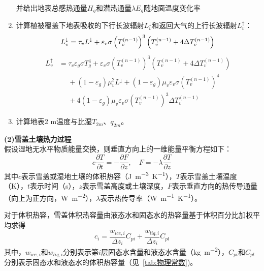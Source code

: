 \begin{enumerate}
    并给出地表总感热通量$H_g$和潜热通量$\lambda E_g$随地面温度变化率
    \item 计算植被覆盖下地表吸收的下行长波辐射$L_{v}^\downarrow$和返回大气的上行长波辐射$L_v ^\uparrow$：
    \begin{equation}
        L_{v} ^\downarrow =  \tau_{v} L ^\downarrow+\varepsilon_{v}\sigma \left (T_{v}^{(n - 1)}\right)^3\left( T_{v}^{(n - 1)} + 4\Delta T_{v}^{(n - 1)} \right)\\
    \end{equation}
    \begin{equation}
    \begin{aligned}
        L_{v}^ \uparrow &=  \tau_{v} \varepsilon_{g} \sigma T_{g}^{4}+ \varepsilon_{v}\sigma \left ( T_{v}^{(n - 1)}\right )^3\left( T_{v}^{(n - 1)} + 4\Delta T_{v}^{(n - 1)} \right) \\[1ex]
&\mathrel{\phantom{=}} + \left ( 1- \varepsilon_{g} \right)\mu_{v}^2 L ^\downarrow + \left ( 1- \varepsilon_{g} \right) \mu_{v} \varepsilon_{v} \sigma \left (T_{v}^{(n - 1)}\right) ^4 \\[1ex]
&\mathrel{\phantom{=}} + 4 \left ( 1- \varepsilon_{g} \right) \mu_{v} \varepsilon_{v} \sigma \left (T_{v}^{(n - 1)}\right)^3 \Delta T_{v}^{(n - 1)}
    \end{aligned}
    \end{equation}
    \item 计算地表2 m温度与比湿$T_{2m}$、$q_{2m}$。
\end{enumerate}

\textbf {(2)雪盖土壤热力过程}\\

假设湿地无水平物质能量交换，则垂直方向上的一维能量平衡方程如下：
\begin{equation}\label{eq:WetlandThermalCons1}
    c \frac{\partial T}{\partial t}=-\frac{\partial F}{\partial z},  \quad F=-\lambda \frac{\partial T}{\partial z}
\end{equation}
其中$c$表示雪盖或湿地土壤的体积热容（\unit{J.m^{-3}.K^{-1}}），$T$表示雪盖土壤温度（K），$t$表示时间（s），$z$表示雪盖高度或土壤深度，$F$表示垂直方向的热传导通量（向上为正方向，\unit{W.m^{-2}}），$\lambda$表示热传导率（\unit{W.m^{-1}.K^{-1}}）。

对于体积热容，雪盖体积热容量由液态水和固态水的热容量基于体积百分比加权平均求得
\begin{equation}
c_{i}=\frac{w_{ice, i}}{\Delta z_{i}} C_{pi}+\frac{w_{liq, i}}{\Delta z_{i}} C_{pl}
\end{equation}
其中，$w_{ice,i}$和$w_{liq,i}$分别表示第$i$层固态水含量和液态水含量（\unit{kg.m^{-2}}），$C_{pi}$和$C_{pl}$分别表示固态水和液态水的体积热容量（见~\ref{tab:物理常数})。

